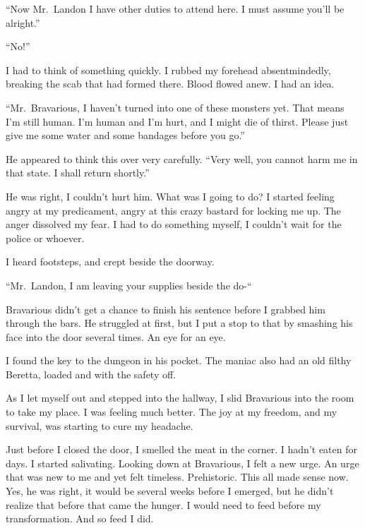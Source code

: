 ``Now Mr.\ Landon I have other duties to attend here. I must
assume you'll be alright.''



``No!''



I had to think of something quickly. I rubbed my forehead
absentmindedly, breaking the scab that had formed there. Blood
flowed anew. I had an idea.



``Mr.\ Bravarious, I haven't turned into one of these
monsters yet. That means I'm still human. I'm human and
I'm hurt, and I might die of thirst. Please just give me some
water and some bandages before you go.''



He appeared to think this over very carefully. ``Very well,
you cannot harm me in that state. I shall return
shortly.''



He was right, I couldn't hurt him. What was I going to do? I
started feeling angry at my predicament, angry at this crazy
bastard for locking me up. The anger dissolved my fear. I had to do
something myself, I couldn't wait for the police or
whoever.



I heard footsteps, and crept beside the doorway.



``Mr.\ Landon, I am leaving your supplies beside the
do-``



Bravarious didn't get a chance to finish his sentence before
I grabbed him through the bars. He struggled at first, but I put a
stop to that by smashing his face into the door several times. An
eye for an eye.



I found the key to the dungeon in his pocket. The maniac also had
an old filthy Beretta, loaded and with the safety off.



As I let myself out and stepped into the hallway, I slid Bravarious
into the room to take my place. I was feeling much better. The joy
at my freedom, and my survival, was starting to cure my
headache.



Just before I closed the door, I smelled the meat in the corner. I
hadn't eaten for days. I started salivating. Looking down at
Bravarious, I felt a new urge. An urge that was new to me and yet
felt timeless. Prehistoric. This all made sense now. Yes, he was
right, it would be several weeks before I emerged, but he
didn't realize that before that came the hunger. I would need
to feed before my transformation. And so feed I did. 

 



%
%
%
%
%
%
%
% 
%
%
%



